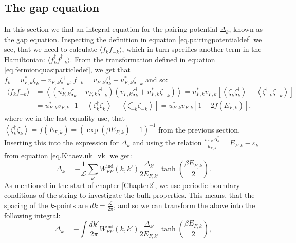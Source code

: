 \subsection{The gap equation} \label{subsec.pairingpotential.integralequation}
In this section we find an integral equation for the pairing potential $\Delta_k$, known as the gap equation. Inspecting the definition in equation \eqref{eq.pairingpotentialdef} we see, that we need to calculate $\langle f_k f_{-k} \rangle$, which in turn specifies another term in the Hamiltonian: $\langle f^\dagger_k f^\dagger_{-k} \rangle$. From the transformation defined in equation \eqref{eq.fermionquasiparticledef}, we get that $f_k = u^*_{F,k}\zeta_k - v_{F,k}\zeta^\dagger_{-k}, f_{-k} = v_{F,k}\zeta^\dagger_k + u^*_{F,k}\zeta_{-k}$ and so:
\begin{align}
\langle f_k f_{-k} \rangle &= \left \langle (u^*_{F,k}\zeta_k - v_{F,k}\zeta^\dagger_{-k}) (v_{F,k}\zeta^\dagger_k + u^*_{F,k}\zeta_{-k}) \right \rangle = u^*_{F,k}v_{F,k}\left[ \left \langle \zeta_k \zeta^\dagger_{k} \right \rangle - \left \langle \zeta^\dagger_{-k} \zeta_{-k} \right \rangle \right]  \nonumber \\
& =  u^*_{F,k}v_{F,k}\left[ 1 - \left \langle \zeta^\dagger_{k} \zeta_k \right \rangle - \left \langle \zeta^\dagger_{-k} \zeta_{-k} \right \rangle \right] = u^*_{F,k}v_{F,k}\left[1 - 2f(E_{F,k})\right], \nonumber
\end{align}
where we in the last equality use, that $\left \langle \zeta^\dagger_{k} \zeta_{k} \right \rangle = f(E_{F,k})=(\exp(\beta E_{F,k})+1)^{-1} $ from the previous section. Inserting this into the expression for $\Delta_k$ and using the relation $\frac{v_{F,k}\Delta^*_k}{u_{F,k}}=E_{F,k}-\varepsilon_k$ from equation \eqref{eq.Kitaev.uk_vk} we get:
\begin{equation}
\Delta_k = - \frac{1}{\mathcal{L}}\sum_{k'} W^\text{ind}_{FF}(k,k')\frac{\Delta_{k'}}{2E_{F,k'}}\tanh\left(\frac{\beta E_{F,k}}{2}\right).
\label{eq.GapequationSum}
\end{equation} 
As mentioned in the start of chapter \ref{Chapter2}, we use periodic boundary conditions of the string to investigate the bulk properties. This means, that the spacing of the $k$-points are $dk = \frac{\mathcal{L}}{2\pi}$, and so we can transform the above into the following integral:
\begin{equation}
\Delta_k = - \int \frac{dk'}{2\pi} W^\text{ind}_{FF}(k,k')\frac{\Delta_{k'}}{2E_{F,k'}}\tanh\left(\frac{\beta E_{F,k}}{2}\right),
\label{eq.GapequationIntegral}
\end{equation} 
